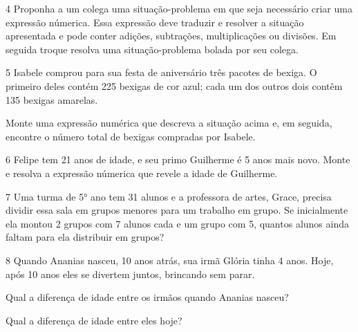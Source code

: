 \pagebreak

\num{4} Proponha a um colega uma situação-problema em que seja necessário
criar uma expressão númerica. Essa expressão deve traduzir e resolver a
situação apresentada e pode conter adições, subtrações, multiplicações 
ou divisões. Em seguida troque resolva uma situação-problema bolada por 
seu colega.

\bigskip
\bigskip
\bigskip
\bigskip
\bigskip
\bigskip
\bigskip
\bigskip

\num{5} Isabele comprou para sua festa de aniversário três pacotes de
bexiga. O primeiro deles contém 225 bexigas de cor azul; cada um dos
outros dois contêm 135 bexigas amarelas.

Monte uma expressão numérica que descreva a situação acima 
e, em seguida, encontre o número total de bexigas compradas por Isabele.

\bigskip
\bigskip
\bigskip
\bigskip
\bigskip
\bigskip
\bigskip

\num{6} Felipe tem 21 anos de idade, e seu primo Guilherme é 5 anos mais
novo. Monte e resolva a expressão númerica que revele a
idade de Guilherme.

\bigskip
\bigskip
\bigskip
\bigskip
\pagebreak

\num{7} Uma turma de 5° ano tem 31 alunos e a professora de artes, Grace,
precisa dividir essa sala em grupos menores para um trabalho em grupo.
Se inicialmente ela montou 2 grupos com 7 alunos cada e um grupo com 5,
quantos alunos ainda faltam para ela distribuir em grupos?

\bigskip
\bigskip
\bigskip
\bigskip
\bigskip

\num{8} Quando Ananias nasceu, 10 anos atrás, sua irmã Glória tinha 4 
anos. Hoje, após 10 anos eles se divertem juntos, brincando sem parar.

\begin{escolha}
\item
  Qual a diferença de idade entre os irmãos quando Ananias nasceu?

\bigskip
\bigskip
\bigskip
\bigskip

\item
  Qual a diferença de idade entre eles hoje?

\end{escolha}

